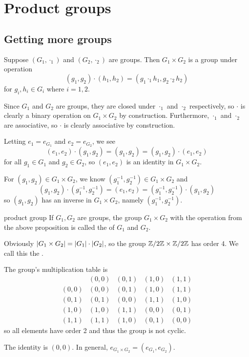 \documentclass[12pt,letterpaper]{report}
\begin{document}
\section{Product groups}

\subsection{Getting more groups}

\begin{prop}{}{}
  Suppose $(G_1, \cdot_1)$ and $(G_2, \cdot_2)$ are groups.
  Then $G_1 \times G_2$ is a group under operation
  \[ (g_1, g_2) \cdot (h_1, h_2) = (g_1 \cdot_1 h_1, g_2 \cdot_2 h_2) \]
  for $g_i, h_i \in G_i$ where $i = 1, 2$.
\end{prop}

\begin{thmproof}
  Since $G_1$ and $G_2$ are groups, they are closed under $\cdot_1$ and $\cdot_2$ respectively, so
  $\cdot$ is clearly a binary operation on $G_1 \times G_2$ by construction.
  Furthermore, $\cdot_1$ and $\cdot_2$ are associative, so $\cdot$ is clearly associative by
  construction.

  Letting $e_1 = e_{G_1}$ and $e_2 = e_{G_2}$, we see
  \[
    (e_1, e_2) \cdot (g_1, g_2) = (g_1, g_2) = (g_1, g_2) \cdot (e_1, e_2)
  \]
  for all $g_1 \in G_1$ and $g_2 \in G_2$, so $(e_1, e_2)$ is an identity in $G_1 \times G_2$.

  For $(g_1, g_2) \in G_1 \times G_2$, we know $(g_1^{-1}, g_2^{-1}) \in G_1 \times G_2$ and
  \[
    (g_1, g_2) \cdot (g_1^{-1}, g_2^{-1}) = (e_1, e_2) = (g_1^{-1}, g_2^{-1}) \cdot (g_1, g_2)
  \]
  so $(g_1, g_2)$ has an inverse in $G_1 \times G_2$, namely $(g_1^{-1}, g_2^{-1})$.
\end{thmproof}

\begin{defn}{product group}{}
  If $G_1, G_2$ are groups, the group $G_1 \times G_2$ with the operation from the above
  proposition is called the  of $G_1$ and $G_2$.
\end{defn}

\begin{ex}
  Obviously $\lvert G_1 \times G_2\rvert = \lvert G_1\rvert \cdot \lvert G_2\rvert$, so the group
  $\mathbb{Z}/{2}\mathbb{Z} \times \mathbb{Z}/{2}\mathbb{Z}$ has order 4.
  We call this the .

  The group's multiplication table is
  \[
    \begin{array}{c|cccc}
             & (0, 0) & (0, 1) & (1, 0) & (1, 1) \\
      \hline
      (0, 0) & (0, 0) & (0, 1) & (1, 0) & (1, 1) \\
      (0, 1) & (0, 1) & (0, 0) & (1, 1) & (1, 0) \\
      (1, 0) & (1, 0) & (1, 1) & (0, 0) & (0, 1) \\
      (1, 1) & (1, 1) & (1, 0) & (0, 1) & (0, 0)
    \end{array}
  \]
  so all elements have order 2 and thus the group is not cyclic.

  The identity is $(0, 0)$.
  In general, $e_{G_1 \times G_2} = (e_{G_1}, e_{G_2})$.
\end{ex}
\end{document}
